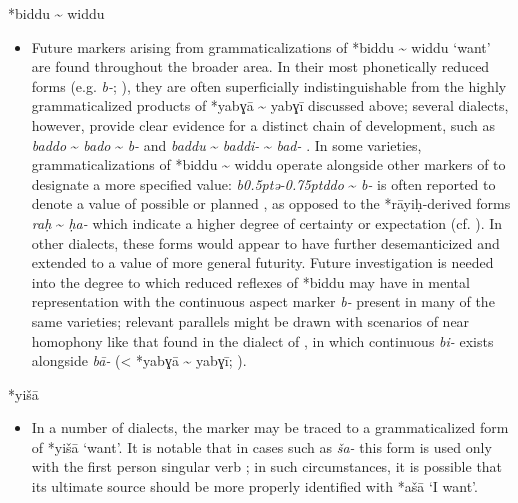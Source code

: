 \documentclass[output=paper]{langsci/langscibook}
\begin{document}
*biddu {\textasciitilde} widdu

\begin{itemize}

  \item[]
Future  markers arising from grammaticalizations of *biddu {\textasciitilde} widdu ‘want’ are found throughout the broader  area. In their most phonetically reduced forms (e.g.  \textit{b-}; \citealt{Behnstedt1994Soukhne}), they are often superficially indistinguishable from the highly grammaticalized products of *yabɣā {\textasciitilde} yabɣī discussed above; several dialects, however, provide clear evidence for a distinct chain of development, such as  \textit{baddo} {\textasciitilde} \textit{bado} {\textasciitilde} \textit{b-} \citep{Lewin1969} and  \textit{baddu} {\textasciitilde} \textit{baddi-} {\textasciitilde} \textit{bad-} \citep{Procházka2011Cilician}. In some varieties, grammaticalizations of *biddu {\textasciitilde} widdu operate alongside other markers of   to designate a more specified value:  \textit{b\kern 0.5ptǝ\kern -0.75ptddo} {\textasciitilde} \textit{b-} is often reported to denote a  value of possible or planned , as opposed to the *rāyiḥ{}-derived forms \textit{raḥ} {\textasciitilde} \textit{ḥa-} which indicate a higher degree of certainty or expectation (cf. \citealt{Lentin2011Damascus}). In other dialects, these forms would appear to have further desemanticized and extended to a value of more general futurity.  Future investigation is needed into the degree to which reduced reflexes of *biddu may have  in mental representation with the continuous aspect marker \textit{b-} present in many of the same varieties; relevant parallels might be drawn with scenarios of near homophony like that found in the dialect of , in which continuous \textit{bi-} exists alongside  \textit{bā}\textit{{}-} (< *yabɣā {\textasciitilde} yabɣī; \citealt{Davey2016}).
\end{itemize}
 
*yišā

\begin{itemize}

  \item[]
In a number of  dialects, the   marker may be traced to a grammaticalized form of *yišā ‘want’. It is notable that in cases such as  \textit{ša-} this form is used only with the first person singular verb \citep{Watson1993}; in such circumstances, it is possible that its ultimate source should be more properly identified with *ašā ‘I want’.
\end{itemize}
 
\end{document}
